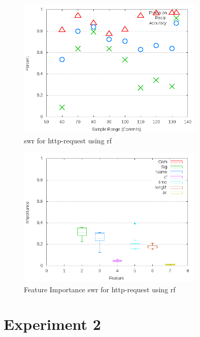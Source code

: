 \begin{figure}[!t]
\centering
\includegraphics[width=0.8\textwidth]{images/rf/test_1/http-request_sample_range.png}
\caption{\gls{swr} for http-request using \gls{rf}}
\label{fig:test_1_http-request_rf}
\end{figure}

\begin{figure}[!t]
\centering
\includegraphics[width=0.8\textwidth]{images/rf/test_1/http-request_importance.png}
\caption{Feature Importance \gls{swr} for http-request using \gls{rf}}
\label{fig:test_1_http-request_rf_importance}
\end{figure}

\section{Experiment 2}
\label{app_sec:experiment_2}

